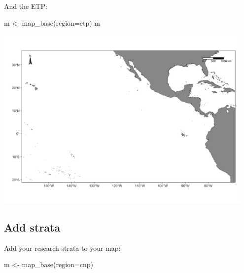 \documentclass[
]{book}
\newenvironment{Shaded}{\begin{snugshade}}{\end{snugshade}}
\newcommand{\AttributeTok}[1]{\textcolor[rgb]{0.77,0.63,0.00}{#1}}
\newcommand{\FunctionTok}[1]{\textcolor[rgb]{0.00,0.00,0.00}{#1}}
\newcommand{\NormalTok}[1]{#1}
\newcommand{\OtherTok}[1]{\textcolor[rgb]{0.56,0.35,0.01}{#1}}
\newcommand{\SpecialCharTok}[1]{\textcolor[rgb]{0.00,0.00,0.00}{#1}}
\newcommand{\StringTok}[1]{\textcolor[rgb]{0.31,0.60,0.02}{#1}}
\begin{document}
And the ETP:

\begin{Shaded}
\begin{Highlighting}[]
\NormalTok{m }\OtherTok{\textless{}{-}} \FunctionTok{map\_base}\NormalTok{(}\AttributeTok{region=}\StringTok{\textquotesingle{}etp\textquotesingle{}}\NormalTok{)}
\NormalTok{m}
\end{Highlighting}
\end{Shaded}

\includegraphics[width=0.95\textwidth,height=\textheight]{img/map_etp.png}

\hypertarget{add-strata}{%
\subsection*{Add strata}\label{add-strata}}

Add your research strata to your map:

\begin{Shaded}
\begin{Highlighting}[]
\NormalTok{m }\OtherTok{\textless{}{-}} \FunctionTok{map\_base}\NormalTok{(}\AttributeTok{region=}\StringTok{\textquotesingle{}cnp\textquotesingle{}}\NormalTok{)}
\end{Highlighting}
\end{Shaded}

\begin{Shaded}
\end{Shaded}
\end{document}
